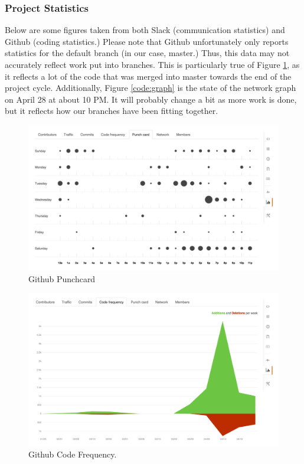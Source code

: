 \documentclass[12pt]{article}
\begin{document}
\subsubsection{Project Statistics}
Below are some figures taken from both Slack (communication statistics) and Github (coding statistics.) Please note that Github unfortunately only reports statistics for the default branch (in our case, master.) Thus, this data may not accurately reflect work put into branches. This is particularly true of Figure \ref{code:freq}, as it reflects a lot of the code that was merged into master towards the end of the project cycle. Additionally, Figure \ref{code:graph} is the state of the network graph on April 28 at about 10 PM. It will probably change a bit as more work is done, but it reflects how our branches have been fitting together.

\begin{figure}[H]
        \centering
        \includegraphics[width=4.5in]{punchcard.png}
        \caption{Github Punchcard}
\end{figure}

\begin{figure}[H]
        \centering
        \includegraphics[width=4.5in]{codefrequency.png}
        \caption{Github Code Frequency.}\label{code:freq}
\end{figure}
\end{document}
